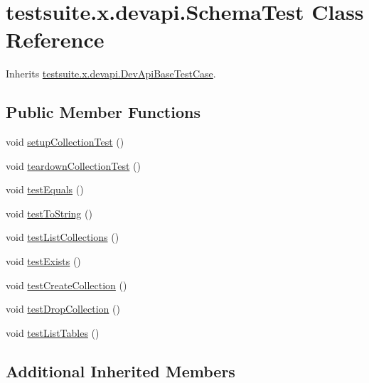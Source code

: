 \hypertarget{classtestsuite_1_1x_1_1devapi_1_1_schema_test}{}\section{testsuite.\+x.\+devapi.\+Schema\+Test Class Reference}
\label{classtestsuite_1_1x_1_1devapi_1_1_schema_test}


Inherits \mbox{\hyperlink{classtestsuite_1_1x_1_1devapi_1_1_dev_api_base_test_case}{testsuite.\+x.\+devapi.\+Dev\+Api\+Base\+Test\+Case}}.

\subsection*{Public Member Functions}
\begin{DoxyCompactItemize}
\item 
void \mbox{\hyperlink{classtestsuite_1_1x_1_1devapi_1_1_schema_test_a4ab88e725bbbb39b7004c0ed785e2d5f}{setup\+Collection\+Test}} ()
\item 
void \mbox{\hyperlink{classtestsuite_1_1x_1_1devapi_1_1_schema_test_a063c338ec35774e69a83e2bcb8513602}{teardown\+Collection\+Test}} ()
\item 
void \mbox{\hyperlink{classtestsuite_1_1x_1_1devapi_1_1_schema_test_aa65a023bb334a1365d3d4e712bf7c831}{test\+Equals}} ()
\item 
void \mbox{\hyperlink{classtestsuite_1_1x_1_1devapi_1_1_schema_test_adcae04f749b1ecf2e19bfbb1658382c1}{test\+To\+String}} ()
\item 
void \mbox{\hyperlink{classtestsuite_1_1x_1_1devapi_1_1_schema_test_a3c99cd7b5b6a72880d98d6d04d67b92b}{test\+List\+Collections}} ()
\item 
void \mbox{\hyperlink{classtestsuite_1_1x_1_1devapi_1_1_schema_test_a33fe571532e5c354c213fb259d7b5db3}{test\+Exists}} ()
\item 
void \mbox{\hyperlink{classtestsuite_1_1x_1_1devapi_1_1_schema_test_a60251e23756f63fd154c5025c21481d3}{test\+Create\+Collection}} ()
\item 
void \mbox{\hyperlink{classtestsuite_1_1x_1_1devapi_1_1_schema_test_a683009663590785741d7ef26101a3e3d}{test\+Drop\+Collection}} ()
\item 
void \mbox{\hyperlink{classtestsuite_1_1x_1_1devapi_1_1_schema_test_aad95fb73c3cabcef7bca5ff99288d62f}{test\+List\+Tables}} ()
\end{DoxyCompactItemize}
\subsection*{Additional Inherited Members}



